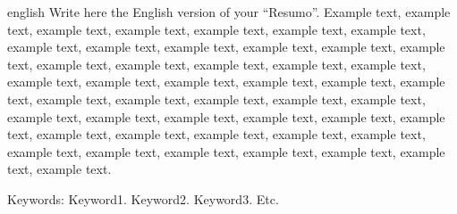 \documentclass[
	12pt,				%
	oneside,			%
	a4paper,			%
	english,			%
	brazil				%
	]{abntex2ppgsi}
\begin{document}
% 
% 
\begin{resumo}[Abstract]
\begin{otherlanguage*}{english}
Write here the English version of your ``Resumo''. Example text, example text, example text, example text, example text, example text, example text, example text, example text, example text, example text, example text, example text, example text, example text, example text, example text, example text, example text, example text, example text, example text, example text, example text, example text, example text, example text, example text, example text, example text, example text, example text, example text, example text, example text, example text, example text, example text, example text, example text, example text, example text, example text, example text, example text, example text, example text.

Keywords: Keyword1. Keyword2. Keyword3. Etc.
\end{otherlanguage*}
\end{resumo}

\listoffigures*
\cleardoublepage

\listofalgorithms
\cleardoublepage

\listoftables*
\cleardoublepage
\end{document}
